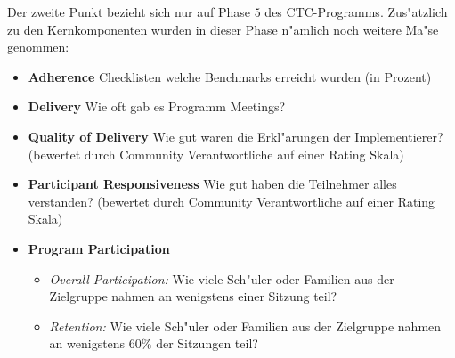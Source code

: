 Der zweite Punkt bezieht sich nur auf Phase $5$ des CTC-Programms. Zus"atzlich zu den Kernkomponenten wurden in dieser Phase n"amlich noch weitere Ma"se genommen:
\begin{itemize}
        \item \textbf{Adherence} Checklisten welche Benchmarks erreicht wurden (in Prozent)
        \item \textbf{Delivery} Wie oft gab es Programm Meetings?
        \item \textbf{Quality of Delivery} Wie gut waren die Erkl"arungen der Implementierer? (bewertet durch Community Verantwortliche auf einer Rating Skala)
        \item \textbf{Participant Responsiveness} Wie gut haben die Teilnehmer alles verstanden? (bewertet durch Community Verantwortliche auf einer Rating Skala)
        \item \textbf{Program Participation}
                \begin{itemize}
                        \item \emph{Overall Participation:} Wie viele Sch"uler oder Familien aus der Zielgruppe nahmen an wenigstens einer Sitzung teil?
                        \item \emph{Retention:} Wie viele Sch"uler oder Familien aus der Zielgruppe nahmen an wenigstens $60 \%$ der Sitzungen teil?
                \end{itemize}
\end{itemize}

